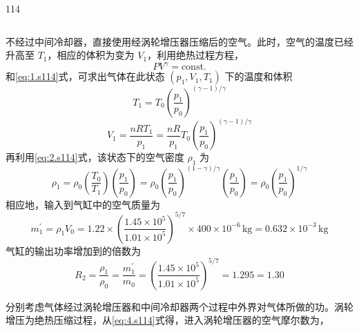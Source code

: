 \begin{solution}{114}
\begin{subsolution}
\begin{equation}
            \label{eq:6.s114}
        \end{equation}
    \end{subsolution}
    \begin{subsolution}
        不经过中间冷却器，直接使用经涡轮增压器压缩后的空气。此时，空气的温度已经升高至 $T_{1}$，相应的体积为变为 $V_{1}$，利用绝热过程方程，
        \begin{equation}
            PV^{\gamma} = \text{const.}
            \label{eq:7.s114}
        \end{equation}
        和\eqref{eq:1.s114}式，可求出气体在此状态 $(p_{1}, V_{1}, T_{1})$ 下的温度和体积
        \begin{equation}
            T_{1} = T_{0} \left(\frac{p_{1}}{p_{0}}\right)^{(\gamma - 1)/\gamma}
            \label{eq:8.s114}
        \end{equation}
        \begin{equation}
            V_{1} = \frac{n R T_{1}}{p_{1}} = \frac{n R}{p_{1}} T_{0} \left(\frac{p_{1}}{p_{0}}\right)^{(\gamma - 1)/\gamma}
            \label{eq:9.s114}
        \end{equation}
        再利用\eqref{eq:2.s114}式，该状态下的空气密度 $\rho_{1}$ 为
        \begin{equation}
            \rho_{1} = \rho_{0} \left(\frac{T_{0}}{T_{1}}\right) \left(\frac{p_{1}}{p_{0}}\right) = \rho_{0} \left(\frac{p_{1}}{p_{0}}\right)^{(1 - \gamma)/\gamma} \left(\frac{p_{1}}{p_{0}}\right) = \rho_{0} \left(\frac{p_{1}}{p_{0}}\right)^{1/\gamma}
            \label{eq:10.s114}
        \end{equation}
        相应地，输入到气缸中的空气质量为
        \begin{equation}
            m_{1}^{\prime} = \rho_{1} V_{0} = 1.22 \times \left(\frac{1.45 \times 10^{5}}{1.01 \times 10^{5}}\right)^{5/7} \times 400 \times 10^{-6} \,\mathrm{kg} = 0.632 \times 10^{-3} \,\mathrm{kg}
            \label{eq:11.s114}
        \end{equation}
        气缸的输出功率增加到的倍数为
        \begin{equation}
            R_{2} = \frac{\rho_{1}}{\rho_{0}} = \frac{m_{1}^{\prime}}{m_{0}} = \left(\frac{1.45 \times 10^{5}}{1.01 \times 10^{5}}\right)^{5/7} = 1.295 = 1.30
            \label{eq:12.s114}
        \end{equation}
    \end{subsolution}
    \begin{subsolution}
        分别考虑气体经过涡轮增压器和中间冷却器两个过程中外界对气体所做的功。涡轮增压为绝热压缩过程，从\eqref{eq:4.s114}式得，进入涡轮增压器的空气摩尔数为，

\end{subsolution}
\end{solution}
